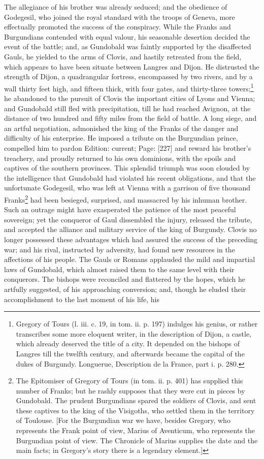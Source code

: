 The allegiance of his brother was already seduced; and the obedience of Godegesil, who joined the royal standard with the troops of Geneva, more effectually promoted the success of the conspiracy. While the Franks and Burgundians contended with equal valour, his seasonable desertion decided the event of the battle; and, as Gundobald was faintly supported by the disaffected Gauls, he yielded to the arms of Clovis, and hastily retreated from the field, which appears to have been situate between Langres and Dijon. He distrusted the strength of Dijon, a quadrangular fortress, encompassed by two rivers, and by a wall thirty feet high, and fifteen thick, with four gates, and thirty-three towers;\footnote{Gregory of Tours (l. iii. c. 19, in tom. ii. p. 197) indulges his genius, or rather transcribes some more eloquent writer, in the description of Dijon, a castle, which already deserved the title of a city. It depended on the bishops of Langres till the twelfth century, and afterwards became the capital of the dukes of Burgundy. Longuerue, Description de la France, part i. p. 280.} he abandoned to the pursuit of Clovis the important cities of Lyons and Vienna; and Gundobald still fled with precipitation, till he had reached Avignon, at the distance of two hundred and fifty miles from the field of battle. A long siege, and an artful negotiation, admonished the king of the Franks of the danger and difficulty of his enterprise. He imposed a tribute on the Burgundian prince, compelled him to pardon Edition: current; Page: [227] and reward his brother\texthebrew{}’s treachery, and proudly returned to his own dominions, with the spoils and captives of the southern provinces. This splendid triumph was soon clouded by the intelligence that Gundobald had violated his recent obligations, and that the unfortunate Godegesil, who was left at Vienna with a garrison of five thousand Franks\footnote{The Epitomiser of Gregory of Tours (in tom. ii. p. 401) has supplied this number of Franks; but he rashly supposes that they were cut in pieces by Gundobald. The prudent Burgundians spared the soldiers of Clovis, and sent these captives to the king of the Visigoths, who settled them in the territory of Toulouse. [For the Burgundian war we have, besides Gregory, who represents the Frank point of view, Marius of Aventicum, who represents the Burgundian point of view. The Chronicle of Marius supplies the date and the main facts; in Gregory\texthebrew{}’s story there is a legendary element.]} had been besieged, surprised, and massacred by his inhuman brother. Such an outrage might have exasperated the patience of the most peaceful sovereign; yet the conqueror of Gaul dissembled the injury, released the tribute, and accepted the alliance and military service of the king of Burgundy. Clovis no longer possessed these advantages which had assured the success of the preceding war; and his rival, instructed by adversity, had found new resources in the affections of his people. The Gauls or Romans applauded the mild and impartial laws of Gundobald, which almost raised them to the same level with their conquerors. The bishops were reconciled and flattered by the hopes, which he artfully suggested, of his approaching conversion; and, though he eluded their accomplishment to the last moment of his life, his 